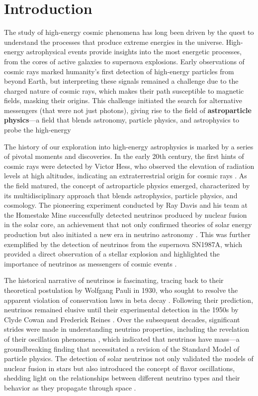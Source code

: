 \chapter{Introduction}
The study of high-energy cosmic phenomena has long been driven by the quest to understand the processes that produce extreme energies in the universe. High-energy astrophysical events provide insights into the
most energetic processes, from the cores of active galaxies to supernova explosions. Early observations of cosmic rays marked humanity's first detection of high-energy particles from beyond Earth, but interpreting
these signals remained a challenge due to the charged nature of cosmic rays, which makes their path susceptible to magnetic fields, masking their origins. This challenge initiated the search for alternative messengers (that were not just photons), giving rise to the field of \textbf{astroparticle physics}—a field that blends astronomy, particle physics, and astrophysics to probe the high-energy

The history of our exploration into high-energy astrophysics is marked by a series of pivotal moments and discoveries. In the early 20th century, the first hints of cosmic rays were detected by Victor Hess, who observed the elevation of radiation levels at high altitudes, indicating an extraterrestrial origin for cosmic rays . As the field matured, the concept of astroparticle physics emerged, characterized by its multidisciplinary approach that blends astrophysics, particle physics, and cosmology. The pioneering experiment conducted by Ray Davis and his team at the Homestake Mine successfully detected neutrinos produced by nuclear fusion in the solar core, an achievement that not only confirmed theories of solar energy production but also initiated a new era in neutrino astronomy . This was further exemplified by the detection of neutrinos from the supernova SN1987A, which provided a direct observation of a stellar explosion and highlighted the importance of neutrinos as messengers of cosmic events . 

The historical narrative of neutrinos is fascinating, tracing back to their theoretical postulation by Wolfgang Pauli in 1930, who sought to resolve the apparent violation of conservation laws in beta decay . Following their prediction, neutrinos remained elusive until their experimental detection in the 1950s by Clyde Cowan and Frederick Reines . Over the subsequent decades, significant strides were made in understanding neutrino properties, including the revelation of their oscillation phenomena , which indicated that neutrinos have mass—a groundbreaking finding that necessitated a revision of the Standard Model of particle physics. The detection of solar neutrinos not only validated the models of nuclear fusion in stars  but also introduced the concept of flavor oscillations, shedding light on the relationships between different neutrino types and their behavior as they propagate through space .

